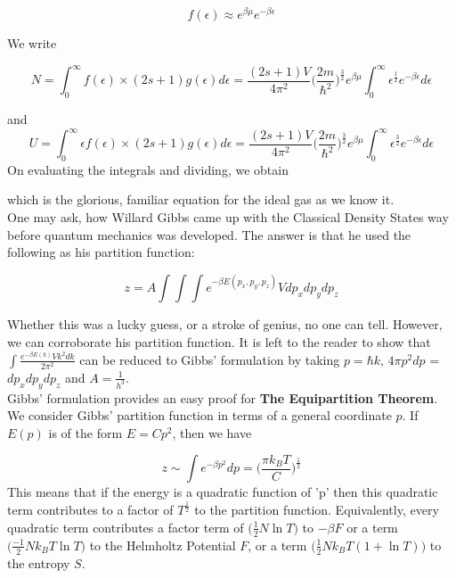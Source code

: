 \documentclass[oneside]{book}
\begin{document}
\[f(\epsilon) \approx e^{\beta\mu}e^{-\beta\epsilon} \]

We write 

\[  N =  \int_{0}^{\infty}f(\epsilon) \times (2s+1)g(\epsilon)d\epsilon =
 \frac{(2s+1)V}{4\pi^2}\Bigg(\frac{2m}{\hbar^2}\Bigg)^{\frac{3}{2}}e^{\beta\mu}\int_{0}^{\infty} \epsilon^{\frac{1}{2}}e^{-\beta\epsilon}d\epsilon 
 \]

and
\[  U =  \int_{0}^{\infty}\epsilon f(\epsilon) \times (2s+1)g(\epsilon)d\epsilon = 
 \frac{(2s+1)V}{4\pi^2}\Bigg(\frac{2m}{\hbar^2}\Bigg)^{\frac{3}{2}}e^{\beta\mu}\int_{0}^{\infty} \epsilon^{\frac{3}{2}}e^{-\beta\epsilon}d\epsilon 
\]
On evaluating the integrals and dividing, we obtain

\begin{center}
\end{center}
which is the glorious, familiar equation for the ideal gas as we know it.\\

One may ask, how Willard Gibbs came up with the Classical Density States way before quantum mechanics was developed. The answer is that he used the following as his partition function:

\[z = A\int\int\int e^{-\beta E(p_x,p_y,p_z)}Vdp_xdp_ydp_z \]

Whether this was a lucky guess, or a stroke of genius, no one can tell. However, we can corroborate his partition function. It is left to the reader to show that $\int\frac{e^{-\beta E(k)}Vk^2dk}{2\pi^2}$ can be reduced to Gibbs' formulation by taking $p = \hbar k$, $4\pi p^2dp$ = $dp_xdp_ydp_z$ and $A = \frac{1}{h^3}$.\\ 

Gibbs' formulation provides an easy proof for \textbf{The Equipartition Theorem}. We consider Gibbs' partition function in terms of a general coordinate $p$. If $E(p)$ is of the form $E = Cp^2$, then we have

\[z \sim \int e^{-\beta p^2}dp = \Bigg( \frac{\pi k_BT}{C}\Bigg)^{\frac{1}{2}}\]
This means that if the energy is a quadratic function of 'p' then this quadratic term contributes to a factor of $T^\frac{1}{2}$ to the partition function. Equivalently, every quadratic term contributes a factor term of $\Big(\frac{1}{2}N\ln T\Big)$ to $-\beta F$ or a term $\Big(\frac{-1}{2}Nk_BT\ln T\Big)$ to the Helmholtz Potential $F$, or a term $\Big(\frac{1}{2}Nk_BT(1+ \ln T)\Big)$ to the entropy $S$. \\
\end{document}
